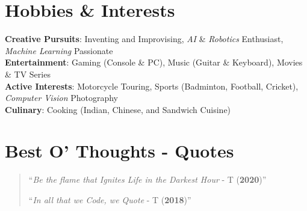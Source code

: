 \documentclass[letterpaper,11pt]{article}
\begin{document}
\section{Hobbies \& Interests}
\begin{itemize}[leftmargin=0.15in, label={}]
    \small{\item{
        \textbf{Creative Pursuits}{: Inventing and Improvising, \textit{AI} \& \textit{Robotics} Enthusiast, \textit{Machine Learning} Passionate} \\
        \textbf{Entertainment}{: Gaming (Console \& PC), Music (Guitar \& Keyboard), Movies \& TV Series} \\
        \textbf{Active Interests}{: Motorcycle Touring, Sports (Badminton, Football, Cricket), \textit{Computer Vision} Photography} \\
        \textbf{Culinary}{: Cooking (Indian, Chinese, and Sandwich Cuisine)}
    }}
\end{itemize}

\section{Best O’ Thoughts - Quotes }
\begin{quote}

``\textit{Be the flame that Ignites Life in the Darkest Hour} - T (\textbf{2020})''

``\textit{In all that we Code, we Quote} - T (\textbf{2018})''

\end{quote}
\end{document}
